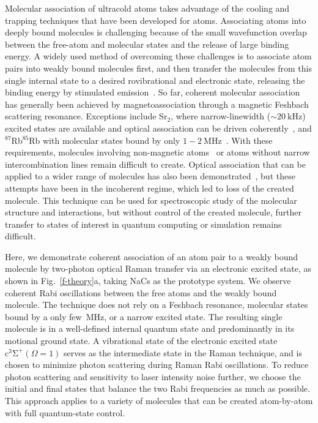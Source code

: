\documentclass[aps,prx,twocolumn,10pt,superscriptaddress]{revtex4-2}
\begin{document}
Molecular association of ultracold atoms takes advantage of the cooling and trapping techniques
that have been developed for atoms.
Associating atoms into deeply bound molecules is challenging
because of the small wavefunction overlap between the free-atom and molecular states
and the release of large binding energy.
A widely used method of overcoming these challenges is to associate atom pairs
into weakly bound molecules first,
and then transfer the molecules from this single internal state
to a desired rovibrational and electronic state,
releasing the binding energy by stimulated emission~\cite{Danzl2008, Ni2008, Lang2008,
  Takekoshi2014, Molony2014, Park2015, Guo2016, Kondov2019, Voges2020}.
So far, coherent molecular association has generally been achieved by magnetoassociation
through a magnetic Feshbach scattering resonance.
Exceptions include Sr$_2$, where narrow-linewidth ($\sim 20~\mathrm{kHz}$) excited states
are available and optical association can be driven coherently~\cite{Stellmer2012,Reinaudi2012},
and $^{87}$Rb$^{85}$Rb with molecular states bound by only $1-2~\mathrm{MHz}$~\cite{He331}.
With these requirements, molecules involving non-magnetic atoms~\cite{PhysRevX.10.031037}
or atoms without narrow intercombination lines remain difficult to create.
Optical association that can be applied to a wider range of molecules
has also been demonstrated~\cite{Wynar2000,Rom2004,Liu2019},
but these attempts have been in the incoherent regime, which led to loss of the created molecule.
This technique can be used for spectroscopic study of the molecular structure and interactions,
but without control of the created molecule, further transfer to states of interest in quantum computing or simulation remains difficult.

Here, we demonstrate coherent association of an atom pair to a weakly bound molecule
by two-photon optical Raman transfer via an electronic excited state,
as shown in Fig.~\ref{f-theory}a, taking NaCs as the prototype system. We observe coherent Rabi oscillations between the free atoms and the weakly bound molecule.
The technique does not rely on a Feshbach resonance,
molecular states bound by a only few~MHz, or a narrow excited state.
The resulting single molecule is in a well-defined internal quantum state
and predominantly in its motional ground state.
A vibrational state of the electronic excited state $\mathrm{c^3\Sigma^+}(\Omega = 1)$
serves as the intermediate state in the Raman technique,
and is chosen to minimize photon scattering during Raman Rabi oscillations.
To reduce photon scattering and sensitivity to laser intensity noise further,
we choose the initial and final states that balance the two Rabi frequencies as much as possible.
This approach applies to a variety of molecules that can be created atom-by-atom
with full quantum-state control.
\end{document}
